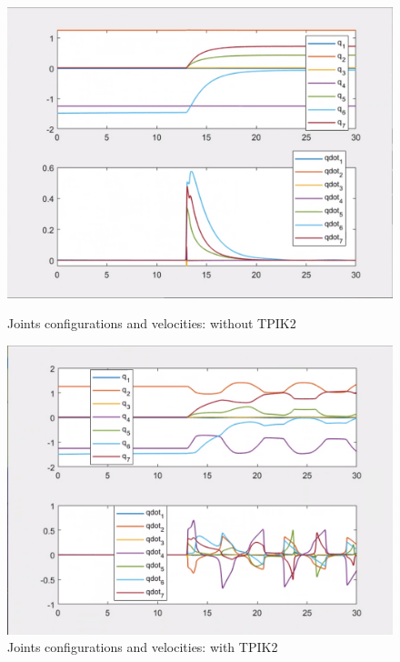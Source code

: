 \documentclass{article}
\begin{document}
\begin{figure}[htpb] 
\begin{minipage}{0.40\textwidth} 
\includegraphics[width=\textwidth]{522_4_wout_TPIK2.png} 
\caption[Joints configurations and velocities: without TPIK2]{Joints configurations and velocities: without TPIK2}\label{Jqandqdot_wout_TPIK2} 
\end{minipage} 
\hspace{0.2\textwidth} 
\begin{minipage}{0.40\textwidth}  
\includegraphics[width=\textwidth]{522_4_w_TPIK2.png}
\caption[Joints configurations and velocities: with TPIK2]{Joints configurations and velocities: with TPIK2}\label{Jqandqdot_w_TPIK2} 
\end{minipage}  
\end{figure}
\end{document}
